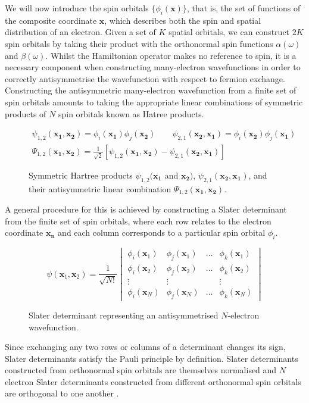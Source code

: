 We will now introduce the spin orbitals $\{\phi_i(\mathbf{x})\}$, that is, the set of functions of the composite coordinate $\mathbf{x}$, which describes both the spin and spatial distribution of an electron. Given a set of $K$ spatial orbitals, we can construct $2K$ spin orbitals by taking their product with the orthonormal spin functions $\alpha(\omega)$ and $\beta(\omega)$. Whilst the Hamiltonian operator makes no reference to spin, it is a necessary component when constructing many-electron wavefunctions in order to correctly antisymmetrise the wavefunction with respect to fermion exchange. Constructing the antisymmetric many-electron wavefunction from a finite set of spin orbitals amounts to taking the appropriate linear combinations of symmetric products of $N$ spin orbitals known as Hatree products.
\begin{figure}[H]
\centering
\begin{gather*}
\psi_{1,2}(\mathbf{x_1}, \mathbf{x_2}) = \phi_i(\mathbf{x_1}) \phi_j(\mathbf{x_2}) \qquad
\psi_{2,1}(\mathbf{x_2}, \mathbf{x_1}) = \phi_i(\mathbf{x_2}) \phi_j(\mathbf{x_1}) \\[1ex]
\Psi_{1,2}(\mathbf{x_1}, \mathbf{x_2}) = \frac{1}{\sqrt{2}} \left[ \psi_{1,2}(\mathbf{x_1}, \mathbf{x_2}) - \psi_{2,1}(\mathbf{x_2}, \mathbf{x_1}) \right]
\end{gather*}
\caption{Symmetric Hartree products $\psi_{1,2}(\mathbf{x_1}$ and $\mathbf{x_2})$, $\psi_{2,1}(\mathbf{x_2}, \mathbf{x_1})$, and their antisymmetric linear combination $\Psi_{1,2}(\mathbf{x_1}, \mathbf{x_2})$.}
\end{figure}

A general procedure for this is achieved by constructing a Slater determinant from the finite set of spin orbitals, where each row relates to the electron coordinate $\mathbf{x_n}$ and each column corresponds to a particular spin orbital $\phi_i$. 
\begin{figure}[H]
\centering
\begin{equation*}
\psi(\mathbf{x}_1, \mathbf{x}_2) =
%
\frac{1}{\sqrt{N!}} \begin{vmatrix}
\phi_i (\mathbf{x}_1) & \phi_j (\mathbf{x}_1) & \dots & \phi_k (\mathbf{x}_1) \\
\phi_i (\mathbf{x}_2) & \phi_j (\mathbf{x}_2) & \dots & \phi_k (\mathbf{x}_2) \\
\vdots & \vdots &   & \vdots \\
\phi_i (\mathbf{x}_N) & \phi_j (\mathbf{x}_N) & \dots & \phi_k (\mathbf{x}_N)
\end{vmatrix}
\end{equation*}
\caption{Slater determinant representing an antisymmetrised $N$-electron wavefunction.}
\end{figure}
Since exchanging any two rows or columns of a determinant changes its sign, Slater determinants satisfy the Pauli principle by definition. Slater determinants constructed from orthonormal spin orbitals are themselves normalised and $N$ electron Slater determinants constructed from different orthonormal spin orbitals are orthogonal to one another \cite{Atilla1996}.

